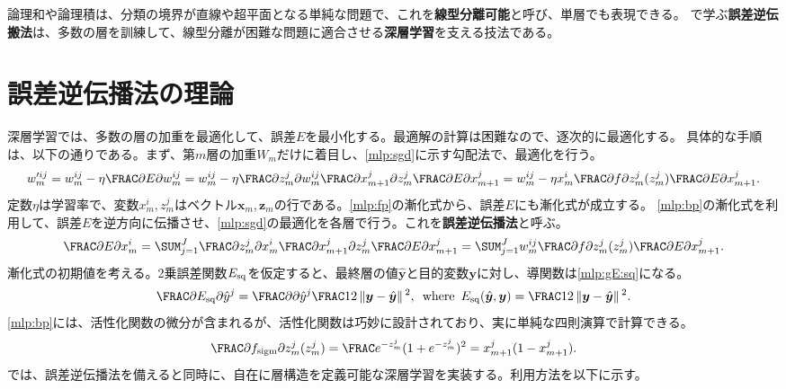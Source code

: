 \documentclass[10pt,a4paper]{book}
\begin{document}
論理和や論理積は、分類の境界が直線や超平面となる単純な問題で、これを\textbf{線型分離可能}と呼び、単層でも表現できる。
で学ぶ\textbf{誤差逆伝搬法}は、多数の層を訓練して、線型分離が困難な問題に適合させる\textbf{深層学習}を支える技法である。

\section{誤差逆伝播法の理論\label{sect:mlp}}

深層学習では、多数の層の加重を最適化して、誤差$E$を最小化する。最適解の計算は困難なので、逐次的に最適化する。
具体的な手順は、以下の通りである。まず、第$m$層の加重$W_m$だけに着目し、\eqref{mlp:sgd}に示す勾配法で、最適化を行う。
%
\begin{equation}
\label{eq:mlp:sgd}
w_m'^{ij}
= w_m^{ij}-\eta \pdiff{E}{w_m^{ij}}
= w_m^{ij}-\eta \pdiff{z_m^j}{w_m^{ij}} \pdiff{x_{m+1}^j}{z_m^j} \pdiff{E}{x_{m+1}^j}
= w_m^{ij}-\eta x_m^i \pdiff{f}{z_m^j}(z_m^j) \pdiff{E}{x_{m+1}^j}.
\end{equation}
%
定数$\eta$は学習率で、変数$x_m^i,z_m^j$はベクトル$\bm{x}_m,\bm{z}_m$の行である。\eqref{mlp:fp}の漸化式から、誤差$E$にも漸化式が成立する。
\eqref{mlp:bp}の漸化式を利用して、誤差$E$を逆方向に伝播させ、\eqref{mlp:sgd}の最適化を各層で行う。これを\textbf{誤差逆伝播法}と呼ぶ。
%
\begin{equation}
\label{eq:mlp:bp}
\pdiff{E}{x_m^i}
= \sum_{j=1}^J \pdiff{z_m^j}{x_m^i} \pdiff{x_{m+1}^j}{z_m^j} \pdiff{E}{x_{m+1}^j}
= \sum_{j=1}^J w_m^{ij} \pdiff{f}{z_m^j}(z_m^j) \pdiff{E}{x_{m+1}^j}.
\end{equation}
%
漸化式の初期値を考える。2乗誤差関数$E_\mathrm{sq}$を仮定すると、最終層の値$\hat{\bm{y}}$と目的変数$\bm{y}$に対し、導関数は\eqref{mlp:gE:sq}になる。
%
\begin{equation}
\label{eq:mlp:gE:sq}
\pdiff{\Esq}{\hat{y}^j} = \pdiff{}{\hat{y}^j} \frac{1}{2} \norm{\bm{y}-\hat{\bm{y}}}^2,
\where
\Esq(\hat{\bm{y}},\bm{y}) = \frac{1}{2} \norm{\bm{y}-\hat{\bm{y}}}^2.
\end{equation}
%
\eqref{mlp:bp}には、活性化関数の微分が含まれるが、活性化関数は巧妙に設計されており、実に単純な四則演算で計算できる。
%
\begin{equation}
\label{eq:nn:sigm:d}
\pdiff{\sigm}{z_m^j}(z_m^j) = \frac{e^{-z_m^j}}{(1+e^{-z_m^j})^2} = x_{m+1}^j(1-x_{m+1}^j).
\end{equation}
%
では、誤差逆伝播法を備えると同時に、自在に層構造を定義可能な深層学習を実装する。利用方法を以下に示す。
\end{document}
